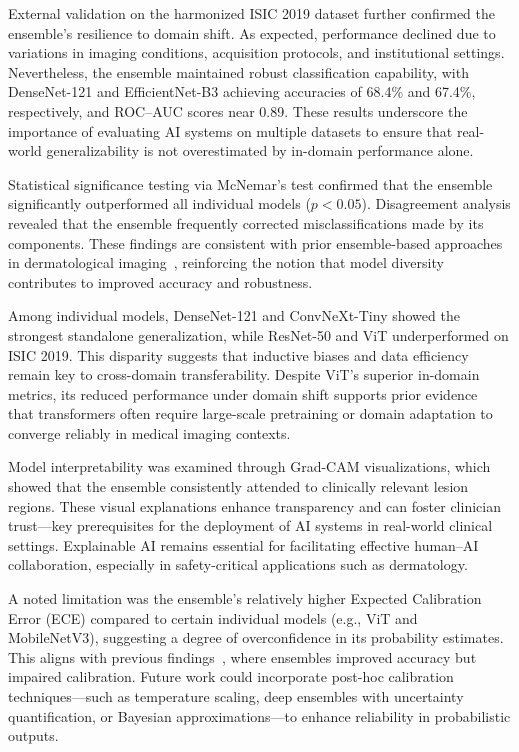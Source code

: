 \documentclass[pdflatex,sn-mathphys-num]{sn-jnl}%
\theoremstyle{thmstyleone}%
\theoremstyle{thmstyletwo}%
\theoremstyle{thmstylethree}%
\begin{document}
External validation on the harmonized ISIC 2019 dataset further confirmed the ensemble’s resilience to domain shift. As expected, performance declined due to variations in imaging conditions, acquisition protocols, and institutional settings. Nevertheless, the ensemble maintained robust classification capability, with DenseNet-121 and EfficientNet-B3 achieving accuracies of 68.4\% and 67.4\%, respectively, and ROC–AUC scores near 0.89. These results underscore the importance of evaluating AI systems on multiple datasets to ensure that real-world generalizability is not overestimated by in-domain performance alone.

Statistical significance testing via McNemar’s test confirmed that the ensemble significantly outperformed all individual models ($p < 0.05$). Disagreement analysis revealed that the ensemble frequently corrected misclassifications made by its components. These findings are consistent with prior ensemble-based approaches in dermatological imaging~\cite{thwin2024skin, mahbod2019fusing}, reinforcing the notion that model diversity contributes to improved accuracy and robustness.

Among individual models, DenseNet-121 and ConvNeXt-Tiny showed the strongest standalone generalization, while ResNet-50 and ViT underperformed on ISIC 2019. This disparity suggests that inductive biases and data efficiency remain key to cross-domain transferability. Despite ViT’s superior in-domain metrics, its reduced performance under domain shift supports prior evidence~\cite{he2023transformers} that transformers often require large-scale pretraining or domain adaptation to converge reliably in medical imaging contexts.

Model interpretability was examined through Grad-CAM visualizations, which showed that the ensemble consistently attended to clinically relevant lesion regions. These visual explanations enhance transparency and can foster clinician trust—key prerequisites for the deployment of AI systems in real-world clinical settings. Explainable AI remains essential for facilitating effective human–AI collaboration, especially in safety-critical applications such as dermatology.

A noted limitation was the ensemble’s relatively higher Expected Calibration Error (ECE) compared to certain individual models (e.g., ViT and MobileNetV3), suggesting a degree of overconfidence in its probability estimates. This aligns with previous findings~\cite{lakshminarayanan2017simple}, where ensembles improved accuracy but impaired calibration. Future work could incorporate post-hoc calibration techniques—such as temperature scaling, deep ensembles with uncertainty quantification, or Bayesian approximations—to enhance reliability in probabilistic outputs.
\end{document}
